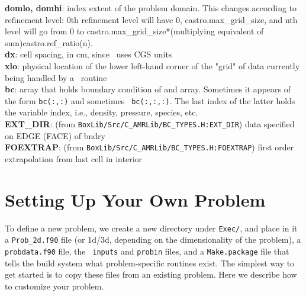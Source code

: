 {\bf domlo, domhi}: index extent of the problem domain. This changes
according to refinement level: 0th refinement level will have 0,
castro.max\_grid\_size, and nth level will go from 0 to
castro.max\_grid\_size*(multiplying equivalent of
sum)castro.ref\_ratio(n).\\

{\bf dx}: cell spacing, in cm, since \castro\ uses CGS
units\\

{\bf xlo}: physical location of the lower left-hand corner of the
"grid" of data currently being handled by a \castro\ routine\\

{\bf bc}: array that holds boundary condition of and array. Sometimes
it appears of the form {\tt bc(:,:)} and sometimes {\tt
  bc(:,:,:)}. The last index of the latter holds the variable index,
i.e., density, pressure, species, etc.\\

{\bf EXT\_DIR}: (from {\tt BoxLib/Src/C\_AMRLib/BC\_TYPES.H:EXT\_DIR}) data
specified on EDGE (FACE) of bndry\\

{\bf FOEXTRAP}: (from {\tt BoxLib/Src/C\_AMRLib/BC\_TYPES.H:FOEXTRAP}) first
order extrapolation from last cell in interior \castro


\section{Setting Up Your Own Problem}

To define a new problem, we create a new directory under {\tt Exec/},
and place in it a {\tt Prob\_2d.f90} file (or 1d/3d, depending on the
dimensionality of the problem), a {\tt probdata.f90} file, the {\tt
  inputs} and {\tt probin} files, and a {\tt Make.package} file that
tells the build system what problem-specific routines exist.  The
simplest way to get started is to copy these files from an existing
problem.  Here we describe how to customize your problem.

